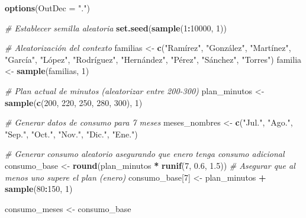 \documentclass[
]{article}
\author{}
\date{\vspace{-2.5em}}
\newenvironment{Shaded}{\begin{snugshade}}{\end{snugshade}}
\newcommand{\AttributeTok}[1]{\textcolor[rgb]{0.13,0.29,0.53}{#1}}
\newcommand{\CommentTok}[1]{\textcolor[rgb]{0.56,0.35,0.01}{\textit{#1}}}
\newcommand{\DecValTok}[1]{\textcolor[rgb]{0.00,0.00,0.81}{#1}}
\newcommand{\FloatTok}[1]{\textcolor[rgb]{0.00,0.00,0.81}{#1}}
\newcommand{\FunctionTok}[1]{\textcolor[rgb]{0.13,0.29,0.53}{\textbf{#1}}}
\newcommand{\NormalTok}[1]{#1}
\newcommand{\OtherTok}[1]{\textcolor[rgb]{0.56,0.35,0.01}{#1}}
\newcommand{\SpecialCharTok}[1]{\textcolor[rgb]{0.81,0.36,0.00}{\textbf{#1}}}
\newcommand{\StringTok}[1]{\textcolor[rgb]{0.31,0.60,0.02}{#1}}
\begin{document}
\begin{Shaded}
\begin{Highlighting}[]
\FunctionTok{options}\NormalTok{(}\AttributeTok{OutDec =} \StringTok{"."}\NormalTok{)}

\CommentTok{\# Establecer semilla aleatoria}
\FunctionTok{set.seed}\NormalTok{(}\FunctionTok{sample}\NormalTok{(}\DecValTok{1}\SpecialCharTok{:}\DecValTok{10000}\NormalTok{, }\DecValTok{1}\NormalTok{))}

\CommentTok{\# Aleatorización del contexto}
\NormalTok{familias }\OtherTok{\textless{}{-}} \FunctionTok{c}\NormalTok{(}\StringTok{"Ramírez"}\NormalTok{, }\StringTok{"González"}\NormalTok{, }\StringTok{"Martínez"}\NormalTok{, }\StringTok{"García"}\NormalTok{, }\StringTok{"López"}\NormalTok{, }\StringTok{"Rodríguez"}\NormalTok{,}
              \StringTok{"Hernández"}\NormalTok{, }\StringTok{"Pérez"}\NormalTok{, }\StringTok{"Sánchez"}\NormalTok{, }\StringTok{"Torres"}\NormalTok{)}
\NormalTok{familia }\OtherTok{\textless{}{-}} \FunctionTok{sample}\NormalTok{(familias, }\DecValTok{1}\NormalTok{)}

\CommentTok{\# Plan actual de minutos (aleatorizar entre 200{-}300)}
\NormalTok{plan\_minutos }\OtherTok{\textless{}{-}} \FunctionTok{sample}\NormalTok{(}\FunctionTok{c}\NormalTok{(}\DecValTok{200}\NormalTok{, }\DecValTok{220}\NormalTok{, }\DecValTok{250}\NormalTok{, }\DecValTok{280}\NormalTok{, }\DecValTok{300}\NormalTok{), }\DecValTok{1}\NormalTok{)}

\CommentTok{\# Generar datos de consumo para 7 meses}
\NormalTok{meses\_nombres }\OtherTok{\textless{}{-}} \FunctionTok{c}\NormalTok{(}\StringTok{"Jul."}\NormalTok{, }\StringTok{"Ago."}\NormalTok{, }\StringTok{"Sep."}\NormalTok{, }\StringTok{"Oct."}\NormalTok{, }\StringTok{"Nov."}\NormalTok{, }\StringTok{"Dic."}\NormalTok{, }\StringTok{"Ene."}\NormalTok{)}

\CommentTok{\# Generar consumo aleatorio asegurando que enero tenga consumo adicional}
\NormalTok{consumo\_base }\OtherTok{\textless{}{-}} \FunctionTok{round}\NormalTok{(plan\_minutos }\SpecialCharTok{*} \FunctionTok{runif}\NormalTok{(}\DecValTok{7}\NormalTok{, }\FloatTok{0.6}\NormalTok{, }\FloatTok{1.5}\NormalTok{))}
\CommentTok{\# Asegurar que al menos uno supere el plan (enero)}
\NormalTok{consumo\_base[}\DecValTok{7}\NormalTok{] }\OtherTok{\textless{}{-}}\NormalTok{ plan\_minutos }\SpecialCharTok{+} \FunctionTok{sample}\NormalTok{(}\DecValTok{80}\SpecialCharTok{:}\DecValTok{150}\NormalTok{, }\DecValTok{1}\NormalTok{)}

\NormalTok{consumo\_meses }\OtherTok{\textless{}{-}}\NormalTok{ consumo\_base}


\end{Highlighting}
\end{Shaded}
\end{document}
